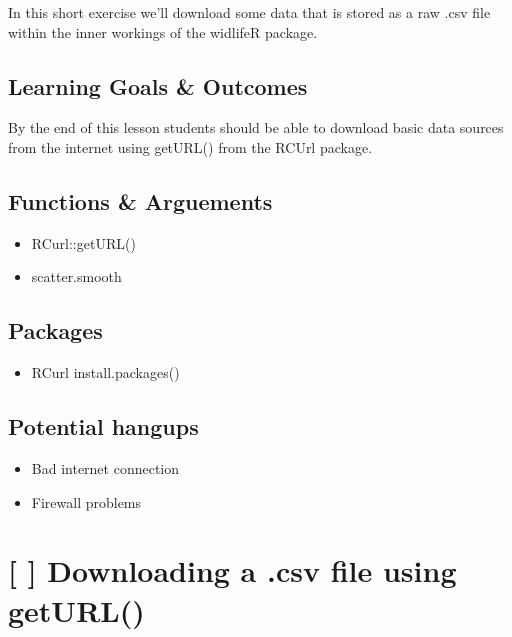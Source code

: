 \documentclass[
]{book}
\providecommand{\tightlist}{%
  \setlength{\itemsep}{0pt}\setlength{\parskip}{0pt}}
\begin{document}
In this short exercise we'll download some data that is stored as a raw .csv file within the inner workings of the widlifeR package.

\hypertarget{learning-goals-outcomes}{%
\subsection{Learning Goals \& Outcomes}\label{learning-goals-outcomes}}

By the end of this lesson students should be able to download basic data sources from the internet using getURL() from the RCUrl package.

\hypertarget{functions-arguements-2}{%
\subsection{Functions \& Arguements}\label{functions-arguements-2}}

\begin{itemize}
\tightlist
\item
  RCurl::getURL()
\item
  scatter.smooth
\end{itemize}

\hypertarget{packages-2}{%
\subsection{Packages}\label{packages-2}}

\begin{itemize}
\tightlist
\item
  RCurl
  install.packages()
\end{itemize}

\hypertarget{potential-hangups-1}{%
\subsection{Potential hangups}\label{potential-hangups-1}}

\begin{itemize}
\tightlist
\item
  Bad internet connection
\item
  Firewall problems
\end{itemize}

\hypertarget{downloading-a-.csv-file-using-geturl}{%
\section{{[} {]} Downloading a .csv file using getURL()}\label{downloading-a-.csv-file-using-geturl}}
\end{document}
